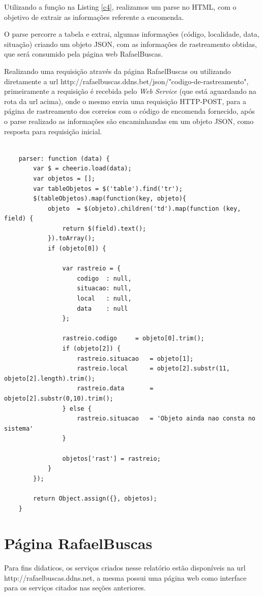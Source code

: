 \documentclass[12pt]{article}
\begin{document}
	Utilizando a função na Listing \ref{c4}, realizamos um parse no HTML, com o objetivo de extrair as informações referente a encomenda.
	
	O parse percorre a tabela e extrai, algumas informações (código, localidade, data, situação) criando um objeto JSON, com as informações de rastreamento obtidas, que será consumido pela página web RafaelBuscas.
	
	Realizando uma requisição através da página RafaelBuscas ou utilizando diretamente a url http://rafaelbuscas.ddns.bet/json/"codigo-de-rastreamento", primeiramente a requisição é recebida pelo \textit{Web Service} (que está aguardando na rota da url acima), onde o mesmo envia uma requisição HTTP-POST, para a página de rastreamento dos correios com o código de encomenda fornecido, após o parse realizado as informações são encaminhandas em um objeto JSON, como resposta para requisição inicial.   
	\medskip
	\begin{lstlisting}[caption=Criando um Crawling para parsar as tags,label=c4]
	
	parser: function (data) {
		var $ = cheerio.load(data);
		var objetos = [];
		var tableObjetos = $('table').find('tr');
		$(tableObjetos).map(function(key, objeto){
			objeto  = $(objeto).children('td').map(function (key, field) {
				return $(field).text();
			}).toArray();
			if (objeto[0]) {
				
				var rastreio = {
					codigo  : null,
					situacao: null,
					local   : null,
					data    : null
				};
				
				rastreio.codigo     = objeto[0].trim();
				if (objeto[2]) {
					rastreio.situacao   = objeto[1];
					rastreio.local      = objeto[2].substr(11, objeto[2].length).trim();
					rastreio.data       = objeto[2].substr(0,10).trim();
				} else {
					rastreio.situacao   = 'Objeto ainda nao consta no sistema'
				}
				
				objetos['rast'] = rastreio;
			}
		});
		
		return Object.assign({}, objetos);
	}
	  	\end{lstlisting}
	  	
	  	
	  	\section{Página RafaelBuscas}
	  	Para fins didaticos, os serviços criados nesse relatório estão disponíveis na url http://rafaelbuscas.ddns.net, a mesma possui uma página web como interface para os serviços citados nas seções anteriores.
	  	
\end{document}
